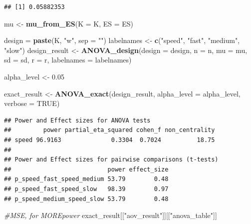 \documentclass[
]{book}
\newenvironment{Shaded}{\begin{snugshade}}{\end{snugshade}}
\newcommand{\CommentTok}[1]{\textcolor[rgb]{0.56,0.35,0.01}{\textit{#1}}}
\newcommand{\DataTypeTok}[1]{\textcolor[rgb]{0.13,0.29,0.53}{#1}}
\newcommand{\FloatTok}[1]{\textcolor[rgb]{0.00,0.00,0.81}{#1}}
\newcommand{\KeywordTok}[1]{\textcolor[rgb]{0.13,0.29,0.53}{\textbf{#1}}}
\newcommand{\NormalTok}[1]{#1}
\newcommand{\OtherTok}[1]{\textcolor[rgb]{0.56,0.35,0.01}{#1}}
\newcommand{\StringTok}[1]{\textcolor[rgb]{0.31,0.60,0.02}{#1}}
\begin{document}
\begin{verbatim}
## [1] 0.05882353
\end{verbatim}

\begin{Shaded}
\begin{Highlighting}[]
\NormalTok{mu <-}\StringTok{ }\KeywordTok{mu_from_ES}\NormalTok{(}\DataTypeTok{K =}\NormalTok{ K, }\DataTypeTok{ES =}\NormalTok{ ES)}

\NormalTok{design =}\StringTok{ }\KeywordTok{paste}\NormalTok{(K, }\StringTok{"w"}\NormalTok{, }\DataTypeTok{sep =} \StringTok{""}\NormalTok{)}
\NormalTok{labelnames <-}\StringTok{ }\KeywordTok{c}\NormalTok{(}\StringTok{"speed"}\NormalTok{, }\StringTok{"fast"}\NormalTok{, }\StringTok{"medium"}\NormalTok{, }\StringTok{"slow"}\NormalTok{)}
\NormalTok{design_result <-}\StringTok{ }\KeywordTok{ANOVA_design}\NormalTok{(}\DataTypeTok{design =}\NormalTok{ design,}
                   \DataTypeTok{n =}\NormalTok{ n, }
                   \DataTypeTok{mu =}\NormalTok{ mu, }
                   \DataTypeTok{sd =}\NormalTok{ sd, }
                   \DataTypeTok{r =}\NormalTok{ r, }
                   \DataTypeTok{labelnames =}\NormalTok{ labelnames)}

\NormalTok{alpha_level <-}\StringTok{ }\FloatTok{0.05}

\NormalTok{exact_result <-}\StringTok{ }\KeywordTok{ANOVA_exact}\NormalTok{(design_result,}
                            \DataTypeTok{alpha_level =}\NormalTok{ alpha_level,}
                            \DataTypeTok{verbose =} \OtherTok{TRUE}\NormalTok{)}
\end{Highlighting}
\end{Shaded}

\begin{verbatim}
## Power and Effect sizes for ANOVA tests
##         power partial_eta_squared cohen_f non_centrality
## speed 96.9163              0.3304  0.7024          18.75
## 
## Power and Effect sizes for pairwise comparisons (t-tests)
##                           power effect_size
## p_speed_fast_speed_medium 53.79        0.48
## p_speed_fast_speed_slow   98.39        0.97
## p_speed_medium_speed_slow 53.79        0.48
\end{verbatim}

\begin{Shaded}
\begin{Highlighting}[]
\CommentTok{#MSE, for MOREpower}
\NormalTok{exact_result[[}\StringTok{"aov_result"}\NormalTok{]][[}\StringTok{"anova_table"}\NormalTok{]]}
\end{Highlighting}
\end{Shaded}
\end{document}
